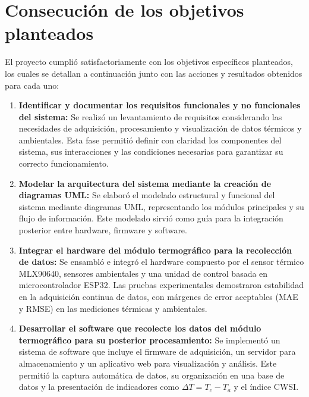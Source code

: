 \section{Consecución de los objetivos planteados}
\label{sec:consecucion_objetivos}

El proyecto cumplió satisfactoriamente con los objetivos específicos planteados, los cuales se detallan a continuación junto con las acciones y resultados obtenidos para cada uno:

\begin{enumerate}
    \item \textbf{Identificar y documentar los requisitos funcionales y no funcionales del sistema:}  
    Se realizó un levantamiento de requisitos considerando las necesidades de adquisición, procesamiento y visualización de datos térmicos y ambientales.  
    Esta fase permitió definir con claridad los componentes del sistema, sus interacciones y las condiciones necesarias para garantizar su correcto funcionamiento.

    \item \textbf{Modelar la arquitectura del sistema mediante la creación de diagramas UML:}  
    Se elaboró el modelado estructural y funcional del sistema mediante diagramas UML, representando los módulos principales y su flujo de información.  
    Este modelado sirvió como guía para la integración posterior entre hardware, firmware y software.

    \item \textbf{Integrar el hardware del módulo termográfico para la recolección de datos:}  
    Se ensambló e integró el hardware compuesto por el sensor térmico MLX90640, sensores ambientales y una unidad de control basada en microcontrolador ESP32.  
    Las pruebas experimentales demostraron estabilidad en la adquisición continua de datos, con márgenes de error aceptables (MAE y RMSE) en las mediciones térmicas y ambientales.

    \item \textbf{Desarrollar el software que recolecte los datos del módulo termográfico para su posterior procesamiento:}  
    Se implementó un sistema de software que incluye el firmware de adquisición, un servidor para almacenamiento y un aplicativo web para visualización y análisis.  
    Este permitió la captura automática de datos, su organización en una base de datos y la presentación de indicadores como $\Delta T = T_c - T_a$ y el índice CWSI.


\end{enumerate}
